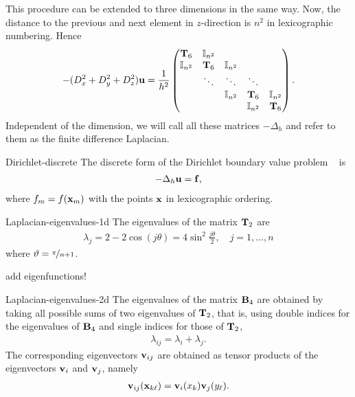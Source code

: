 \begin{remark}
  This procedure can be extended to three dimensions in the same
  way. Now, the distance to the previous and next element in
  $z$-direction is $n^2$ in lexicographic numbering. Hence
  \begin{gather}
    -(D_x^2+D_y^2+D_z^2) \vu = \frac1{h^2}
    \begin{pmatrix}
      \matt_6 & \id_{n^2} \\
      \id_{n^2} & \matt_6 & \id_{n^2} \\
      &\ddots & \ddots & \ddots \\
      &&\id_{n^2} & \matt_6 & \id_{n^2} \\
      &&&\id_{n^2} & \matt_6 \\
    \end{pmatrix}.
  \end{gather}
  Independent of the dimension, we will call all these matrices
  $-\Delta_h$ and refer to them as the finite difference Laplacian.
\end{remark}

\begin{Example}{Dirichlet-discrete}
  The discrete form of the Dirichlet boundary value problem
  ~ is
  \begin{gather}
    -\Delta_h \vu = \vf,
  \end{gather}
  where $f_m = f(\vx_m)$ with the points $\vx$ in lexicographic ordering.
\end{Example}

\begin{Lemma}{Laplacian-eigenvalues-1d}
  The eigenvalues of the matrix $\matt_2$ are
  \begin{gather}
    \lambda_j = 2 - 2\cos(j\theta) = 4 \sin^2 \frac{j\theta}2,
    \quad j=1,\dots, n
  \end{gather}
  where $\theta = \nicefrac{\pi}{n+1}$.
\end{Lemma}

\begin{todo}
  add eigenfunctions!
\end{todo}

\begin{Lemma}{Laplacian-eigenvalues-2d}
  The eigenvalues of the matrix $\matb_4$ are obtained by taking all
  possible sums of two eigenvalues of $\matt_2$, that is, using double
  indices for the eigenvalues of $\matb_4$ and single indices for
  those of $\matt_2$,
  \begin{gather}
    \lambda_{ij} = \lambda_i+\lambda_j.
  \end{gather}
  The corresponding eigenvectors $\vv_{ij}$ are obtained as tensor
  products of the eigenvectors $\vv_i$ and $\vv_j$, namely
  \begin{gather}
    \vv_{ij}(\vx_{k\ell}) = \vv_i(x_k)\vv_j(y_\ell).
  \end{gather}
\end{Lemma}

